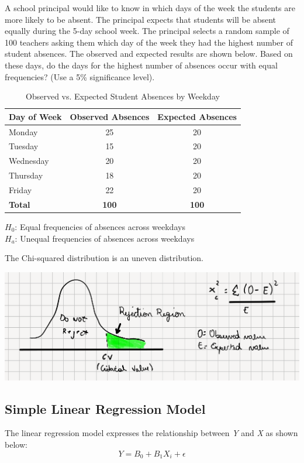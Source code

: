 \documentclass[12pt]{book}
\theoremstyle{definition}
\begin{document}
A school principal would like to know in which days of the week the students are more likely to be absent. The principal expects that students will be absent equally during the 5-day school week. The principal selects a random sample of 100 teachers asking them which day of the week they had the highest number of student absences. The observed and expected results are shown below. Based on these days, do the days for the highest number of absences occur with equal frequencies? (Use a 5\% significance level).

\begin{table}[h]
    \centering
    \caption{Observed vs. Expected Student Absences by Weekday}
    \begin{tabular}{|l|c|c|}
    \hline
    \textbf{Day of Week} & \textbf{Observed Absences} & \textbf{Expected Absences} \\ \hline
    Monday    & 25 & 20 \\ \hline
    Tuesday   & 15 & 20 \\ \hline
    Wednesday & 20 & 20 \\ \hline
    Thursday  & 18 & 20 \\ \hline
    Friday    & 22 & 20 \\ \hline
    \textbf{Total} & \textbf{100} & \textbf{100} \\ \hline
    \end{tabular}
    \label{tab:absences}
    
    \smallskip
    $H_0$: Equal frequencies of absences across weekdays \\
    $H_a$: Unequal frequencies of absences across weekdays
\end{table}

The Chi-squared distribution is an uneven distribution.

\begin{center}
    \includegraphics[scale=0.4]{../assets/chi-squared.png}
\end{center}


\subsection{Simple Linear Regression Model}
The linear regression model expresses the relationship between \textit{Y} and \textit{X} as shown below:
\begin{equation}
    Y = B_0 + B_1X_i + \epsilon
\end{equation}
\end{document}
